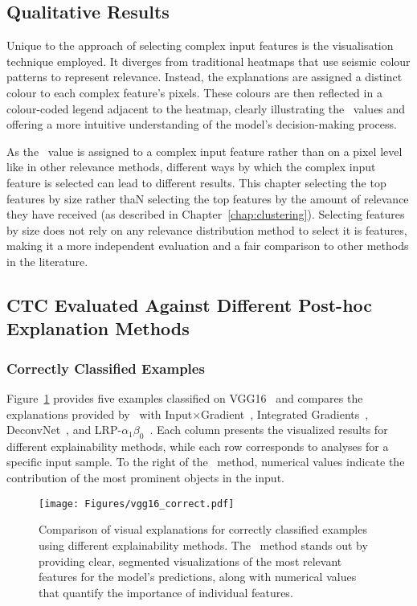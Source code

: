 \subsection{Qualitative Results}
\label{sec:qualitative}

Unique to the approach of selecting complex input features is the visualisation technique employed. It diverges from traditional heatmaps that use seismic colour patterns to represent relevance. Instead, the explanations are assigned a distinct colour to each complex feature's pixels. These colours are then reflected in a colour-coded legend adjacent to the heatmap, clearly illustrating the \CTC\ values and offering a more intuitive understanding of the model's decision-making process.

As the \CTC\ value is assigned to a complex input feature rather than on a pixel level like in other relevance methods, different ways by which the complex input feature is selected can lead to different results. This chapter selecting the top features by size rather thaN selecting the top features by the amount of relevance they have received (as described in Chapter~\ref{chap:clustering}). Selecting features by size does not rely on any relevance distribution method to select it is features, making it a more independent evaluation and a fair comparison to other methods in the literature.

\subsection{CTC Evaluated Against Different Post-hoc Explanation Methods}

\subsubsection{Correctly Classified Examples}
\label{sec:correct}

Figure~\ref{Fig:vgg16_correct} provides five examples classified on VGG16~\cite{SimonyanZ14a} and compares the explanations provided by \CTC\ with Input$\times$Gradient~\cite{SimonyanVZ13}, Integrated Gradients~\cite{SundararajanTY17}, DeconvNet~\cite{ZeilerKTF10}, and LRP-$\alpha_1\beta_0$~\cite{bach2015pixel}. Each column presents the visualized results for different explainability methods, while each row corresponds to analyses for a specific input sample. To the right of the \CTC\ method, numerical values indicate the contribution of the most prominent objects in the input.

\begin{figure}[ht!]
	\begin{center}
		\texttt{[image: Figures/vgg16\_correct.pdf]}
	\end{center}
	\caption{Comparison of visual explanations for correctly classified examples using different explainability methods. The \CTC\ method stands out by providing clear, segmented visualizations of the most relevant features for the model's predictions, along with numerical values that quantify the importance of individual features.}
	\label{Fig:vgg16_correct}
\end{figure}

